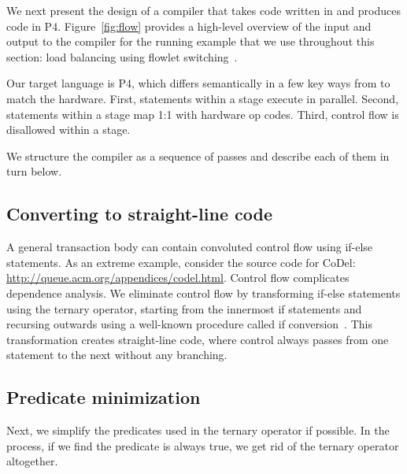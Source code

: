 We next present the design of a compiler that takes code written in
\pktlanguage{} and produces code in P4. Figure~\ref{fig:flow} provides a
high-level overview of the input and output to the compiler for the running
example that we use throughout this section: load balancing using flowlet
switching~\cite{dina_flowlets}.

Our target language is P4, which differs semantically in a few key ways from
\pktlanguage{} to match the hardware. First, statements within a stage execute
in parallel. Second, statements within a stage map 1:1 with hardware op codes.
Third, control flow is disallowed within a stage.

We structure the compiler as a sequence of passes and describe each of them in
turn below. 


\subsection{Converting to straight-line code}
A general transaction body can contain convoluted control flow using if-else
statements. As an extreme example, consider the source code for CoDel:
\url{http://queue.acm.org/appendices/codel.html}. Control flow complicates
dependence analysis. We eliminate control flow by transforming if-else
statements using the ternary operator, starting from the innermost if
statements and recursing outwards using a well-known procedure called if
conversion~\cite{allen_if_conversion}.  This transformation creates
straight-line code, where control always passes from one statement to the next
without any branching.

\subsection{Predicate minimization}
Next, we simplify the predicates used in the ternary operator if possible.  In
the process, if we find the predicate is always true, we get rid of the ternary
operator altogether.

